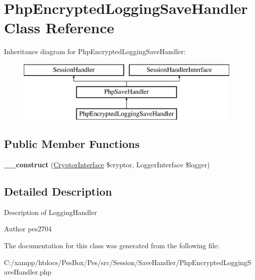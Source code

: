 \hypertarget{class_pes_1_1_session_1_1_save_handler_1_1_php_encrypted_logging_save_handler}{}\section{Php\+Encrypted\+Logging\+Save\+Handler Class Reference}
\label{class_pes_1_1_session_1_1_save_handler_1_1_php_encrypted_logging_save_handler}
Inheritance diagram for Php\+Encrypted\+Logging\+Save\+Handler\+:\begin{figure}[H]
\begin{center}
\leavevmode
\includegraphics[height=3.000000cm]{class_pes_1_1_session_1_1_save_handler_1_1_php_encrypted_logging_save_handler}
\end{center}
\end{figure}
\subsection*{Public Member Functions}
\begin{DoxyCompactItemize}
\item 
\mbox{\label{class_pes_1_1_session_1_1_save_handler_1_1_php_encrypted_logging_save_handler_a2015eacbce43cf3300c984467d6dd25a}} 
{\bfseries \+\_\+\+\_\+construct} (\mbox{\hyperlink{interface_pes_1_1_security_1_1_cryptor_1_1_cryptor_interface}{Cryptor\+Interface}} \$cryptor, Logger\+Interface \$logger)
\end{DoxyCompactItemize}


\subsection{Detailed Description}
Description of Logging\+Handler

\begin{DoxyAuthor}{Author}
pes2704 
\end{DoxyAuthor}


The documentation for this class was generated from the following file\+:\begin{DoxyCompactItemize}
\item 
C\+:/xampp/htdocs/\+Pes\+Box/\+Pes/src/\+Session/\+Save\+Handler/Php\+Encrypted\+Logging\+Save\+Handler.\+php\end{DoxyCompactItemize}
